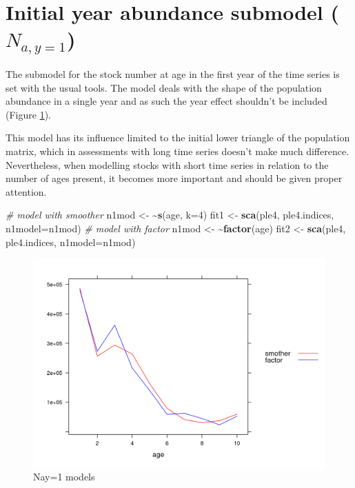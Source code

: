 \documentclass[
]{book}
\newenvironment{Shaded}{\begin{snugshade}}{\end{snugshade}}
\newcommand{\AttributeTok}[1]{\textcolor[rgb]{0.13,0.29,0.53}{#1}}
\newcommand{\CommentTok}[1]{\textcolor[rgb]{0.56,0.35,0.01}{\textit{#1}}}
\newcommand{\DecValTok}[1]{\textcolor[rgb]{0.00,0.00,0.81}{#1}}
\newcommand{\ErrorTok}[1]{\textcolor[rgb]{0.64,0.00,0.00}{\textbf{#1}}}
\newcommand{\FunctionTok}[1]{\textcolor[rgb]{0.13,0.29,0.53}{\textbf{#1}}}
\newcommand{\NormalTok}[1]{#1}
\newcommand{\OtherTok}[1]{\textcolor[rgb]{0.56,0.35,0.01}{#1}}
\begin{document}
\hypertarget{initial-year-abundance-submodel-n_ay1}{%
\section{\texorpdfstring{Initial year abundance submodel (\(N_{a,y=1}\))}{Initial year abundance submodel (N\_\{a,y=1\})}}\label{initial-year-abundance-submodel-n_ay1}}

The submodel for the stock number at age in the first year of the time series is set with the usual tools. The model deals with the shape of the population abundance in a single year and as such the year effect shouldn't be included (Figure \ref{fig:ny1}).

This model has its influence limited to the initial lower triangle of the population matrix, which in assessments with long time series doesn't make much difference. Nevertheless, when modelling stocks with short time series in relation to the number of ages present, it becomes more important and should be given proper attention.

\begin{Shaded}
\begin{Highlighting}[]
\CommentTok{\# model with smoother}
\NormalTok{n1mod }\OtherTok{\textless{}{-}} \ErrorTok{\textasciitilde{}}\FunctionTok{s}\NormalTok{(age, }\AttributeTok{k=}\DecValTok{4}\NormalTok{)}
\NormalTok{fit1 }\OtherTok{\textless{}{-}} \FunctionTok{sca}\NormalTok{(ple4, ple4.indices, }\AttributeTok{n1model=}\NormalTok{n1mod)}
\CommentTok{\# model with factor}
\NormalTok{n1mod }\OtherTok{\textless{}{-}} \ErrorTok{\textasciitilde{}}\FunctionTok{factor}\NormalTok{(age)}
\NormalTok{fit2 }\OtherTok{\textless{}{-}} \FunctionTok{sca}\NormalTok{(ple4, ple4.indices, }\AttributeTok{n1model=}\NormalTok{n1mod)}
\end{Highlighting}
\end{Shaded}

\begin{figure}
\centering
\includegraphics{_bookdown_files/_main_files/figure-html/ny1-1.png}
\caption{\label{fig:ny1}Nay=1 models}
\end{figure}
\end{document}
